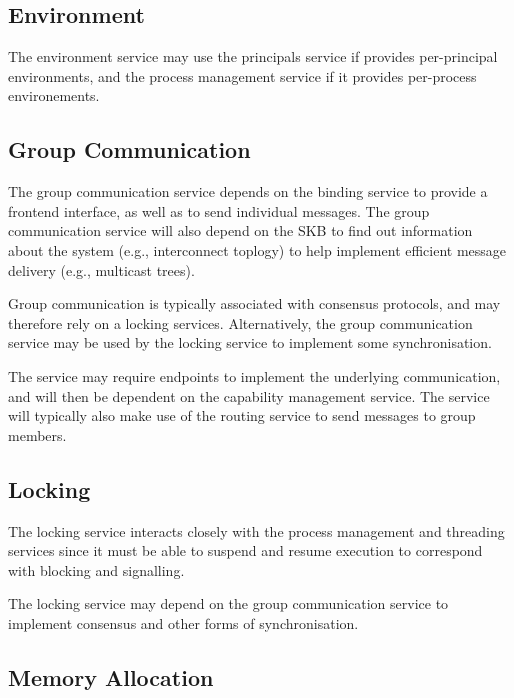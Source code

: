 \documentclass[a4paper,twoside]{report} %
\begin{document}

\subsection{Environment}

The environment service may use the principals service if provides
per-principal environments, and the process management service if it
provides per-process environements. 

\subsection{Group Communication}

The group communication service depends on the binding service to provide a
frontend interface, as well as to send individual messages.
The group communication service will also depend on the SKB to find out
information about the system (e.g., interconnect toplogy) to help
implement efficient message delivery (e.g., multicast trees).

Group communication is typically associated with consensus protocols,
and may therefore rely on a locking services. Alternatively, the group
communication service may be used by the locking service to implement
some synchronisation.

The service may require endpoints to implement the underlying
communication, and will then be dependent on the capability management service.
The service will typically also make use of the routing service to
send messages to group members.

\subsection{Locking}

The locking service interacts closely with the process management and
threading services since it must be able to suspend and resume
execution to correspond with blocking and signalling.

The locking service may depend on the group communication service to
implement consensus and other forms of synchronisation.


\subsection{Memory Allocation}
\end{document}

